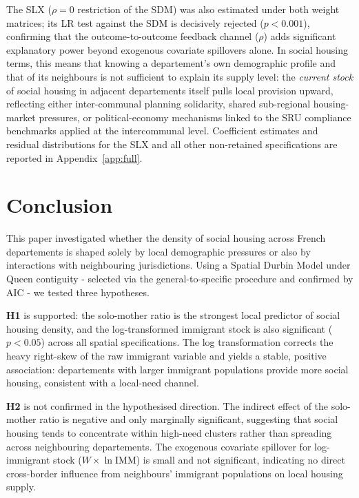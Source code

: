 \documentclass[a4paper,12pt]{article}
\begin{document}
The SLX ($\rho = 0$ restriction of the SDM) was also estimated under both weight matrices; its LR test against the SDM is decisively rejected ($p < 0.001$), confirming that the outcome-to-outcome feedback channel ($\rho$) adds significant explanatory power beyond exogenous covariate spillovers alone. In social housing terms, this means that knowing a departement's own demographic profile and that of its neighbours is not sufficient to explain its supply level: the \emph{current stock} of social housing in adjacent departements itself pulls local provision upward, reflecting either inter-communal planning solidarity, shared sub-regional housing-market pressures, or political-economy mechanisms linked to the SRU compliance benchmarks applied at the intercommunal level. Coefficient estimates and residual distributions for the SLX and all other non-retained specifications are reported in Appendix~\ref{app:full}.

\newpage

\section{Conclusion}

This paper investigated whether the density of social housing across French departements is shaped solely by local demographic pressures or also by interactions with neighbouring jurisdictions. Using a Spatial Durbin Model under Queen contiguity - selected via the \citet{elhorst2010} general-to-specific procedure and confirmed by AIC - we tested three hypotheses.

\textbf{H1} is supported: the solo-mother ratio is the strongest local predictor of social housing density, and the log-transformed immigrant stock is also significant ($p < 0.05$) across all spatial specifications. The log transformation corrects the heavy right-skew of the raw immigrant variable and yields a stable, positive association: departements with larger immigrant populations provide more social housing, consistent with a local-need channel.

\textbf{H2} is not confirmed in the hypothesised direction. The indirect effect of the solo-mother ratio is negative and only marginally significant, suggesting that social housing tends to concentrate within high-need clusters rather than spreading across neighbouring departements. The exogenous covariate spillover for log-immigrant stock ($W\!\times\!\ln\mathrm{IMM}$) is small and not significant, indicating no direct cross-border influence from neighbours' immigrant populations on local housing supply.
\end{document}
